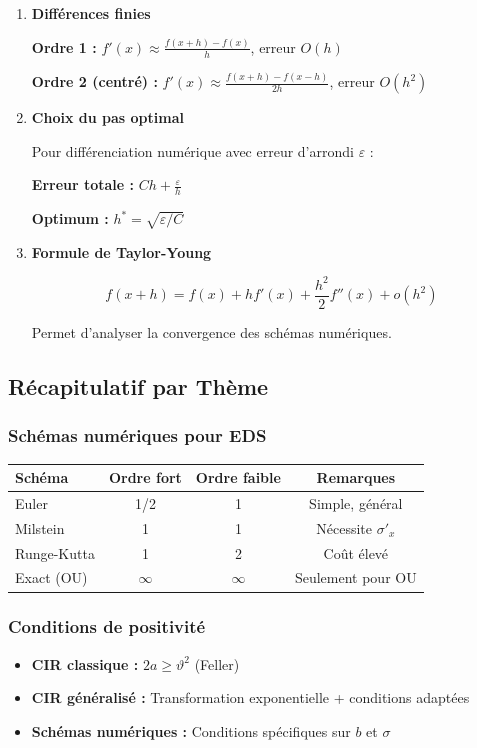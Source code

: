 \documentclass[12pt,a4paper]{article}
\theoremstyle{definition}
\theoremstyle{remark}
\begin{document}
\begin{enumerate}
\item \textbf{Différences finies}

\textbf{Ordre 1 :} $f'(x) \approx \frac{f(x+h) - f(x)}{h}$, erreur $O(h)$

\textbf{Ordre 2 (centré) :} $f'(x) \approx \frac{f(x+h) - f(x-h)}{2h}$, erreur $O(h^2)$

\item \textbf{Choix du pas optimal}

Pour différenciation numérique avec erreur d'arrondi $\varepsilon$ :

\textbf{Erreur totale :} $Ch + \frac{\varepsilon}{h}$

\textbf{Optimum :} $h^* = \sqrt{\varepsilon/C}$

\item \textbf{Formule de Taylor-Young}

\[
f(x+h) = f(x) + hf'(x) + \frac{h^2}{2}f''(x) + o(h^2)
\]

Permet d'analyser la convergence des schémas numériques.
\end{enumerate}

\subsection{Récapitulatif par Thème}

\subsubsection{Schémas numériques pour EDS}

\begin{tabular}{|l|c|c|c|}
\hline
\textbf{Schéma} & \textbf{Ordre fort} & \textbf{Ordre faible} & \textbf{Remarques} \\
\hline
Euler & 1/2 & 1 & Simple, général \\
Milstein & 1 & 1 & Nécessite $\sigma'_x$ \\
Runge-Kutta & 1 & 2 & Coût élevé \\
Exact (OU) & $\infty$ & $\infty$ & Seulement pour OU \\
\hline
\end{tabular}

\subsubsection{Conditions de positivité}

\begin{itemize}
\item \textbf{CIR classique :} $2a \geq \vartheta^2$ (Feller)
\item \textbf{CIR généralisé :} Transformation exponentielle + conditions adaptées
\item \textbf{Schémas numériques :} Conditions spécifiques sur $b$ et $\sigma$
\end{itemize}
\end{document}
